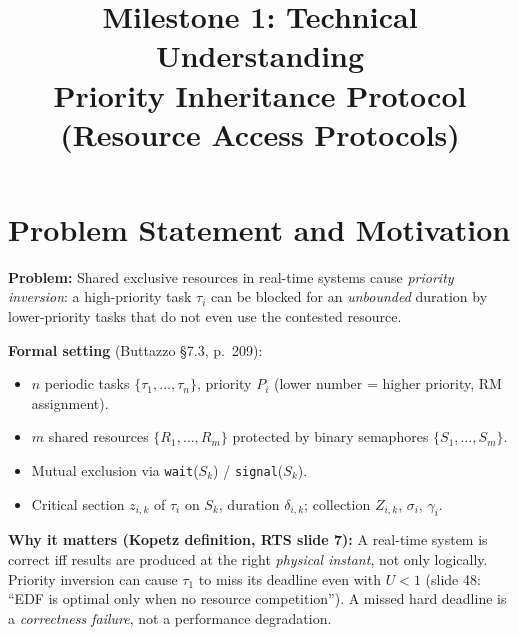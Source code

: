 \documentclass[conference,onecolumn]{IEEEtran}
\begin{document}
\title{Milestone 1: Technical Understanding\\
  {\large Priority Inheritance Protocol (Resource Access Protocols)}}

\author{
}

\maketitle

\section{Problem Statement and Motivation}

\textbf{Problem:} Shared exclusive resources in real-time systems cause
\emph{priority inversion}: a high-priority task $\tau_i$ can be blocked
for an \emph{unbounded} duration by lower-priority tasks that do not
even use the contested resource.

\textbf{Formal setting} (Buttazzo \S7.3, p.~209):
\begin{itemize}
  \item $n$ periodic tasks $\{\tau_1, \ldots, \tau_n\}$, priority $P_i$
        (lower number = higher priority, RM assignment).
  \item $m$ shared resources $\{R_1, \ldots, R_m\}$ protected by binary
        semaphores $\{S_1, \ldots, S_m\}$.
  \item Mutual exclusion via \texttt{wait}($S_k$) / \texttt{signal}($S_k$).
  \item Critical section $z_{i,k}$ of $\tau_i$ on $S_k$, duration
        $\delta_{i,k}$; collection $Z_{i,k}$, $\sigma_i$, $\gamma_i$.
\end{itemize}

\textbf{Why it matters (Kopetz definition, RTS slide 7):}
A real-time system is correct iff results are produced at the right
\emph{physical instant}, not only logically.
Priority inversion can cause $\tau_1$ to miss its deadline even with
$U < 1$ (slide 48: ``EDF is optimal only when no resource competition'').
A missed hard deadline is a \emph{correctness failure}, not a
performance degradation.
\end{document}
